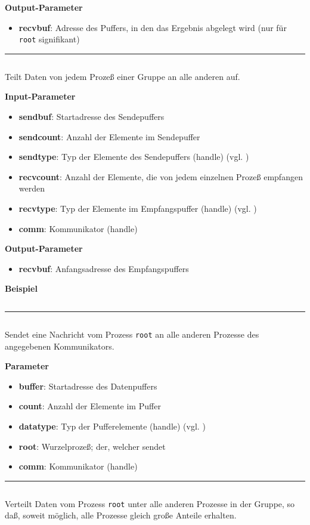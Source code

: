 \textbf{Output-Parameter}
\begin{itemize}
    \item \textbf{recvbuf}: Adresse des Puffers, in den das Ergebnis abgelegt wird (nur für \texttt{root} signifikant)
\end{itemize}
\goodbreak
\rule{\textwidth}{0.4pt}%
\inputminted[numbersep=5pt, tabsize=4]{c}{scripts/mpi/mpi-alltoall.c}
Teilt Daten von jedem Prozeß einer Gruppe an alle anderen auf.

\textbf{Input-Parameter}
\begin{itemize}
    \item \textbf{sendbuf}: Startadresse des Sendepuffers 
    \item \textbf{sendcount}: Anzahl der Elemente im Sendepuffer
    \item \textbf{sendtype}: Typ der Elemente des Sendepuffers (handle) (vgl. )
    \item \textbf{recvcount}: Anzahl der Elemente, die von jedem einzelnen Prozeß empfangen werden
    \item \textbf{recvtype}: Typ der Elemente im Empfangspuffer (handle) (vgl. )
    \item \textbf{comm}: Kommunikator (handle)
\end{itemize}

\textbf{Output-Parameter}
\begin{itemize}
    \item \textbf{recvbuf}: Anfangsadresse des Empfangspuffers
\end{itemize}

\textbf{Beispiel}
\inputminted[numbersep=5pt, tabsize=4]{c}{scripts/mpi/mpi-alltoall-example.c}
\goodbreak
\rule{\textwidth}{0.4pt}%
\inputminted[numbersep=5pt, tabsize=4]{c}{scripts/mpi/mpi-bcast.c}
Sendet eine Nachricht vom Prozess \texttt{root} an alle anderen Prozesse des 
angegebenen Kommunikators.

\textbf{Parameter}
\begin{itemize}
    \item \textbf{buffer}: Startadresse des Datenpuffers 
    \item \textbf{count}: Anzahl der Elemente im Puffer
    \item \textbf{datatype}: Typ der Pufferelemente (handle) (vgl. )
    \item \textbf{root}: Wurzelprozeß; der, welcher sendet
    \item \textbf{comm}: Kommunikator (handle)
\end{itemize}
\goodbreak
\rule{\textwidth}{0.4pt}%
\inputminted[numbersep=5pt, tabsize=4]{c}{scripts/mpi/mpi-scatter.c}
Verteilt Daten vom Prozess \texttt{root} unter alle anderen Prozesse in der Gruppe, so daß, soweit möglich, alle Prozesse gleich große Anteile erhalten.

